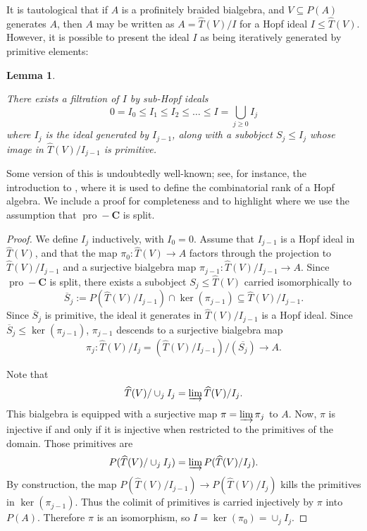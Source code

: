 \documentclass[12pt]{article}
\DeclareMathOperator{\pro}{pro}
\newcommand{\That}{\widehat{T}}
\newcommand{\bC} {\mathbf{C}}
\newcommand{\proC}{\pro\!-\bC}
\theoremstyle{plain}
\newtheorem{lem}[thm]{Lemma}
\theoremstyle{definition}
\theoremstyle{remark}
\begin{document}
It is tautological that if $A$ is a profinitely braided bialgebra, and $V \subseteq P(A)$ generates $A$, then $A$ may be written as $A = \That(V)/I$ for a Hopf ideal $I \leq \That(V)$.  However, it is possible to present the ideal $I$ as being iteratively generated by primitive elements:

\begin{lem} \label{filt_ideal_lem}

There exists a filtration of $I$ by sub-Hopf ideals
%
$$0 = I_0 \leq I_1 \leq I_2 \leq \dots \leq I = \bigcup_{j\geq 0} I_j$$
%
where $I_j$ is the ideal generated by $I_{j-1}$, along with a subobject $S_j \leq I_j$ whose image in $\That(V)/I_{j-1}$ is primitive.

\end{lem}

Some version of this is undoubtedly well-known; see, for instance, the introduction to \cite{diaz-kharchenko}, where it is used to define the combinatorial rank of a Hopf algebra.  We include a proof for completeness and to highlight where we use the assumption that $\proC$ is split.

\begin{proof}

We define $I_j$ inductively, with $I_0 = 0$.  Assume that $I_{j-1}$ is a Hopf ideal in $\That(V)$, and that the map $\pi_0: \That(V) \to A$ factors through the projection to $\That(V)/I_{j-1}$ and a surjective bialgebra map $\pi_{j-1}: \That(V)/I_{j-1} \to A$.  Since $\proC$ is split, there exists a subobject $S_j \leq \That(V)$ carried isomorphically to 
%
$$\overline{S}_j := P(\That(V)/I_{j-1}) \cap \ker(\pi_{j-1}) \subseteq \That(V)/I_{j-1}.$$
%
Since $\overline{S}_j$ is primitive, the ideal it generates in $\That(V)/I_{j-1}$ is a Hopf ideal.  Since $\overline{S}_j \leq \ker(\pi_{j-1})$, $\pi_{j-1}$ descends to a surjective bialgebra map
%
$$\pi_j: \That(V)/I_j = (\That(V)/I_{j-1})/(\overline{S_j}) \to A.$$

Note that 
%
$$\That(V)/\cup_j I_j = \varinjlim \That(V)/I_j.$$
%
This bialgebra is equipped with a surjective map $\pi = \varinjlim \pi_j$ to $A$.  Now, $\pi$ is injective if and only if it is injective when restricted to the primitives of the domain.  Those primitives are
%
$$P(\That(V)/\cup_j I_j) = \varinjlim P(\That(V)/I_j).$$ %
%
By construction, the map $P(\That(V)/I_{j-1}) \to P(\That(V)/I_j)$ kills the primitives in $\ker(\pi_{j-1})$.  Thus the colimit of primitives is carried injectively by $\pi$ into $P(A)$.  Therefore $\pi$ is an isomorphism, so $I = \ker(\pi_0) = \cup_j I_j$.

\end{proof}
\end{document}
